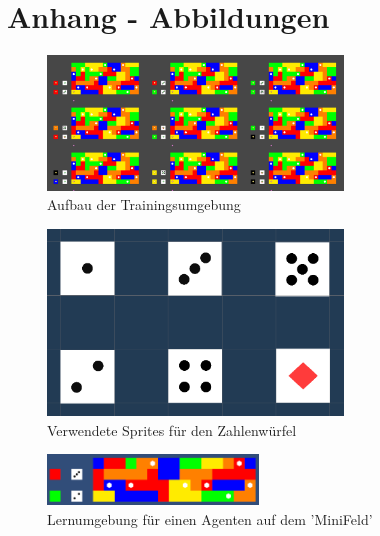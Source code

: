 
\clearpage
\chapter{Anhang - Abbildungen}


\begin{figure}[!htb]
	\centering
	\includegraphics[width=0.7\textwidth]{Bilder/Environment.png}
	\caption{Aufbau der Trainingsumgebung}
    \label{fig:Environment}
\end{figure}

\begin{figure}[!htb]
	\centering
	\includegraphics[width=0.7\textwidth]{Bilder/Sprites.png}
	\caption{Verwendete Sprites für den Zahlenwürfel}
    \label{fig:NumberSprites}
\end{figure}



\begin{figure}[!h]
	\centering
	\includegraphics[width=0.5\textwidth]{Bilder/miniFeld.png}
	\caption{Lernumgebung für einen Agenten auf dem 'MiniFeld'}
	\label{fig:miniFeld}
\end{figure}
